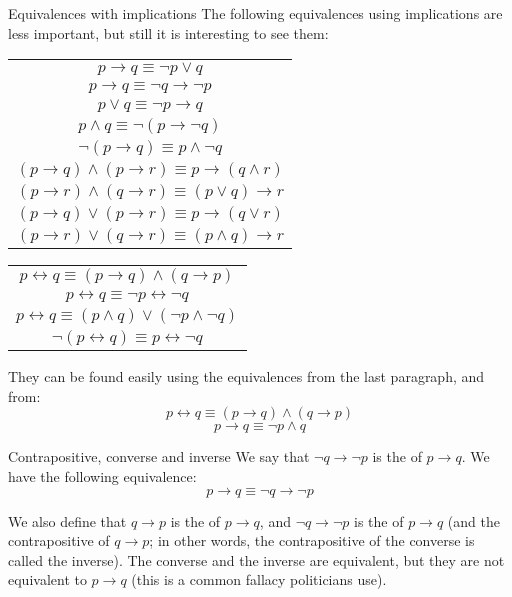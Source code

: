 \documentclass{article}
\begin{document}
\begin{parag}{Equivalences with implications}
    The following equivalences using implications are less important, but still it is interesting to see them:
    \begin{center}
    \begin{tabular}{|c|}
        \hline
        $p \to q \equiv \lnot p \lor q$ \\
        $p \to q \equiv \lnot q \to \lnot p$ \\
        \hline
        $p \lor q \equiv \lnot p \to q$ \\
        $p \land q \equiv \lnot\left(p \to \lnot q\right)$ \\
        $\lnot\left(p \to q\right) \equiv p \land \lnot q$ \\
        \hline
        $\left(p \to q\right) \land\left(p \to r\right) \equiv p \to \left(q \land r\right)$ \\
        $\left(p \to r\right) \land \left(q \to r\right) \equiv \left(p \lor q\right) \to r$ \\
        $\left(p \to q\right) \lor \left(p \to r\right) \equiv p \to \left(q \lor r\right)$ \\
        $\left(p \to r\right) \lor \left(q \to r\right) \equiv \left(p \land q\right) \to r$ \\
        \hline
    \end{tabular}
    \hspace{2em}
    \begin{tabular}{|c|}
        \hline
        $p \leftrightarrow q \equiv \left(p \to q\right) \land \left(q \to p\right)$ \\
        $p \leftrightarrow q \equiv \lnot p \leftrightarrow \lnot q$ \\
        $p \leftrightarrow q \equiv \left(p \land q\right) \lor \left(\lnot p \land\lnot q\right)$ \\
        $\lnot\left(p \leftrightarrow q\right) \equiv p \leftrightarrow \lnot q$ \\
        \hline
    \end{tabular}
    \end{center}
    

    They can be found easily using the equivalences from the last paragraph, and from: 
    \[p \leftrightarrow q \equiv \left(p \to q\right) \land \left(q \to p\right)\]
    \[p \to q \equiv \lnot p \land q\]
\end{parag}

\begin{parag}{Contrapositive, converse and inverse}
    We say that $\lnot q \to \lnot p$ is the  of $p \to q$. We have the following equivalence: 
    \[p\to q \equiv \lnot q \to \lnot p\]
    
    We also define that $q \to p$ is the  of $p \to q$, and $\lnot q \to \lnot p$ is the  of $p \to q$ (and the contrapositive of $q \to p$; in other words, the contrapositive of the converse is called the inverse). The converse and the inverse are equivalent, but they are not equivalent to $p \to q$ (this is a common fallacy politicians use).
\end{parag}
\end{document}
